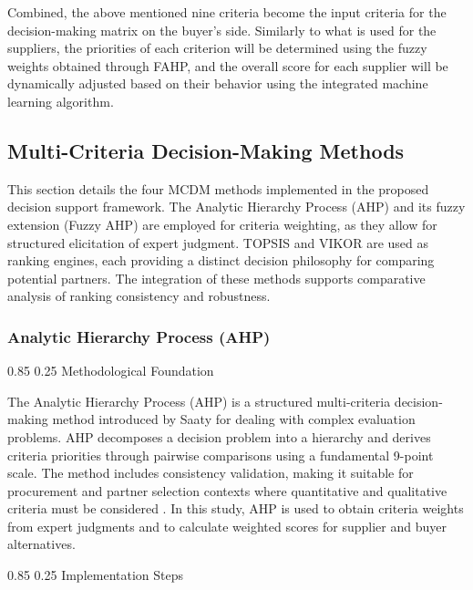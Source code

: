 \documentclass[11pt]{article}
\makeatletter
\renewcommand\paragraph{\@startsection{paragraph}{4}{\z@}%
  {0.85\baselineskip}%
  {0.25\baselineskip}%
  {\normalfont\normalsize\bfseries}}
\makeatother
\begin{document}
Combined, the above mentioned nine criteria become the input criteria for the decision-making matrix on the buyer's side. Similarly to what is used for the suppliers, the priorities of each criterion will be determined using the fuzzy weights obtained through FAHP, and the overall score for each supplier will be dynamically adjusted based on their behavior using the integrated machine learning algorithm.

\subsection{Multi-Criteria Decision-Making Methods}

This section details the four MCDM methods implemented in the proposed decision support framework. The Analytic Hierarchy Process (AHP) and its fuzzy extension (Fuzzy AHP) are employed for criteria weighting, as they allow for structured elicitation of expert judgment. TOPSIS and VIKOR are used as ranking engines, each providing a distinct decision philosophy for comparing potential partners. The integration of these methods supports comparative analysis of ranking consistency and robustness.

\subsubsection{Analytic Hierarchy Process (AHP)}

\paragraph{Methodological Foundation}

The Analytic Hierarchy Process (AHP) is a structured multi-criteria decision-making method introduced by Saaty \cite{ref78} for dealing with complex evaluation problems. AHP decomposes a decision problem into a hierarchy and derives criteria priorities through pairwise comparisons using a fundamental 9-point scale. The method includes consistency validation, making it suitable for procurement and partner selection contexts where quantitative and qualitative criteria must be considered \cite{ref9,ref48}. In this study, AHP is used to obtain criteria weights from expert judgments and to calculate weighted scores for supplier and buyer alternatives.

\paragraph{Implementation Steps}
\end{document}
